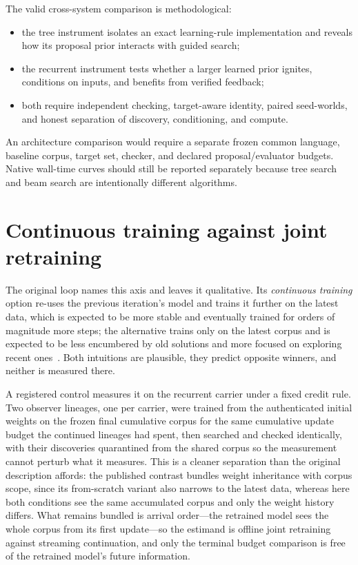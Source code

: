 \documentclass[11pt]{article}
\begin{document}
The valid cross-system comparison is methodological:

\begin{itemize}
  \item the tree instrument isolates an exact learning-rule implementation and reveals how
        its proposal prior interacts with guided search;
  \item the recurrent instrument tests whether a larger learned prior ignites, conditions
        on inputs, and benefits from verified feedback;
  \item both require independent checking, target-aware identity, paired seed-worlds, and
        honest separation of discovery, conditioning, and compute.
\end{itemize}

An architecture comparison would require a separate frozen common language, baseline
corpus, target set, checker, and declared proposal/evaluator budgets.  Native wall-time
curves should still be reported separately because tree search and beam search are
intentionally different algorithms.

\section{Continuous training against joint retraining}

The original loop names this axis and leaves it qualitative.  Its \emph{continuous
training} option re-uses the previous iteration's model and trains it further on the
latest data, which is expected to be more stable and eventually trained for orders of
magnitude more steps; the alternative trains only on the latest corpus and is expected to
be less encumbered by old solutions and more focused on exploring recent
ones~\cite{aliencoding}.  Both intuitions are plausible, they predict opposite winners,
and neither is measured there.

A registered control measures it on the recurrent carrier under a fixed credit rule.  Two
observer lineages, one per carrier, were trained from the authenticated initial weights on
the frozen final cumulative corpus for the same cumulative update budget the continued
lineages had spent, then searched and checked identically, with their discoveries
quarantined from the shared corpus so the measurement cannot perturb what it measures.
This is a cleaner separation than the original description affords: the published contrast
bundles weight inheritance with corpus scope, since its from-scratch variant also narrows
to the latest data, whereas here both conditions see the same accumulated corpus and only
the weight history differs.  What remains bundled is arrival order---the retrained model
sees the whole corpus from its first update---so the estimand is offline joint retraining
against streaming continuation, and only the terminal budget comparison is free of the
retrained model's future information.
\end{document}
